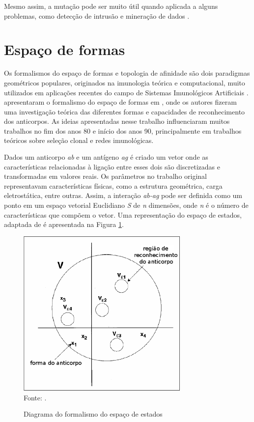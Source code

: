 Mesmo assim, a mutação pode ser muito útil quando aplicada a alguns problemas, como detecção de intrusão e mineração de dados \cite{DeCastro2002}.

\section{Espaço de formas}
\label{sec:ais_shape}

Os formalismos do espaço de formas e topologia de afinidade são dois paradigmas geométricos populares, originados na imunologia teórica e computacional, muito utilizados em aplicações recentes do campo de Sistemas Imunológicos Artificiais \cite{Brownlee2007}. \citeauthor{Perelson1979} apresentaram o formalismo do espaço de formas em \citet{Perelson1979}, onde os autores fizeram uma investigação teórica das diferentes formas e capacidades de reconhecimento dos anticorpos. As ideias apresentadas nesse trabalho influenciaram muitos trabalhos no fim dos anos 80 e início dos anos 90, principalmente em trabalhos teóricos sobre seleção clonal e redes imunológicas.

Dados um anticorpo \emph{ab} e um antígeno \emph{ag} é criado um vetor onde as características relacionadas à ligação entre esses dois são discretizadas e transformadas em valores reais. Os parâmetros no trabalho original representavam características físicas, como a estrutura geométrica, carga eletrostática, entre outras. Assim, a interação \emph{ab-ag} pode ser definida como um ponto em um espaço vetorial Euclidiano \emph{S} de \emph{n} dimensões, onde \emph{n} é o número de características que compõem o vetor. Uma representação do espaço de estados, adaptada de \citet{Brownlee2007} é apresentada na Figura \ref{img:space}.

\vspace{0.5cm}
\begin{figure}[h!]
    \centering
    \caption{Diagrama do formalismo do espaço de estados}
    \label{img:space}
    \vspace{0.5cm}
    \includegraphics[width=0.75\textwidth]{img/space.png}
    \vspace{0.5cm}
    \\ Fonte: \cite{Brownlee2007}.
\end{figure}
\vspace{0.5cm}


